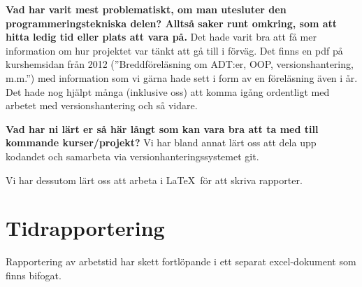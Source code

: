 \documentclass{scrartcl}
\begin{document}
\textbf{Vad har varit mest problematiskt, om man utesluter den programmeringstekniska delen? Alltså saker runt omkring, som att hitta ledig tid eller plats att vara på.}
Det hade varit bra att få mer information om hur projektet var tänkt att gå till i förväg. Det finns en pdf på kurshemsidan från 2012 (''Breddföreläsning om ADT:er, OOP, versionshantering, m.m.'') med information som vi gärna hade sett i form av en föreläsning även i år. Det hade nog hjälpt många (inklusive oss) att komma igång ordentligt med arbetet med versionshantering och så vidare.

\textbf{Vad har ni lärt er så här långt som kan vara bra att ta med till kommande kurser/projekt?} Vi har bland annat lärt oss att dela upp kodandet och samarbeta via versionhanteringssystemet git.

Vi har dessutom lärt oss att arbeta i \LaTeX\ för att skriva rapporter.

\section{Tidrapportering}
Rapportering av arbetstid har skett fortlöpande i ett separat excel-dokument som finns bifogat. 
\end{document}
